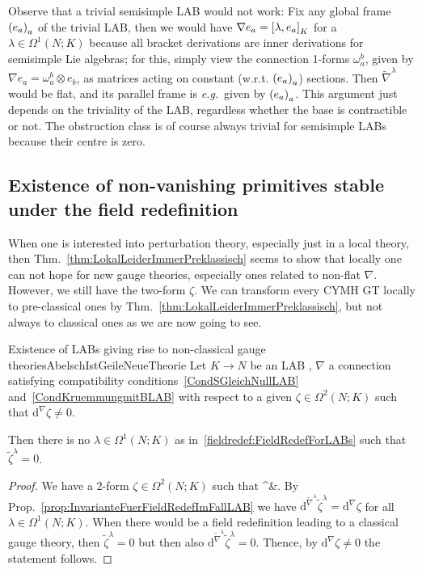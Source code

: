 \begin{remark}
\leavevmode\newline
Observe that a trivial semisimple LAB would not work: Fix any global frame $\mleft( e_a \mright)_a$ of the trivial LAB, then we would have $\nabla e_a = \mleft[ \lambda , e_a \mright]_K$ for a $\lambda \in \Omega^1(N; K)$ because all bracket derivations are inner derivations for semisimple Lie algebras; for this, simply view the connection 1-forms $\omega_a^b$, given by $\nabla e_a = \omega_a^b \otimes e_b$, as matrices acting on constant (w.r.t. $\mleft( e_a \mright)_a$) sections. Then $\widetilde{\nabla}^\lambda$ would be flat, and its parallel frame is \textit{e.g.}~given by $\mleft( e_a \mright)_a$. This argument just depends on the triviality of the LAB, regardless whether the base is contractible or not. The obstruction class is of course always trivial for semisimple LABs because their centre is zero.
\end{remark}

\subsection{Existence of non-vanishing primitives stable under the field redefinition} \label{NonclassicalStuff}

When one is interested into perturbation theory, especially just in a local theory, then Thm.~\ref{thm:LokalLeiderImmerPreklassisch} seems to show that locally one can not hope for new gauge theories, especially ones related to non-flat $\nabla$. However, we still have the two-form $\zeta$. We can transform every CYMH GT locally to pre-classical ones by Thm.~\ref{thm:LokalLeiderImmerPreklassisch}, but not always to classical ones as we are now going to see.

\begin{theorems}{Existence of LABs giving rise to non-classical gauge theories}{AbelschIstGeileNeueTheorie}
Let $K \to N$ be an LAB , $\nabla$ a connection satisfying compatibility conditions~\eqref{CondSGleichNullLAB} and~\eqref{CondKruemmungmitBLAB} with respect to a given $\zeta \in \Omega^2(N; K)$ such that $\mathrm{d}^\nabla \zeta \neq 0$.

Then there is no $\lambda\in\Omega^1(N;K)$ as in~\ref{fieldredef:FieldRedefForLABs} such that $\widetilde{\zeta}^\lambda = 0$.
\end{theorems}

\begin{proof}
\leavevmode\newline
We have a 2-form $\zeta \in \Omega^2(N; K)$ such that
\bas
{}^\nabla \zeta &.
\eas
By Prop.~\ref{prop:InvarianteFuerFieldRedefImFallLAB} we have $\mathrm{d}^{\widetilde{\nabla}^\lambda} \widetilde{\zeta}^\lambda= \mathrm{d}^\nabla \zeta$ for all $\lambda \in \Omega^1(N;K)$. When there would be a field redefinition leading to a classical gauge theory, then $\widetilde{\zeta}^\lambda = 0$ but then also $\mathrm{d}^{\widetilde{\nabla}^\lambda} \widetilde{\zeta}^\lambda = 0$. Thence, by $\mathrm{d}^\nabla \zeta \neq 0$ the statement follows.
\end{proof}

